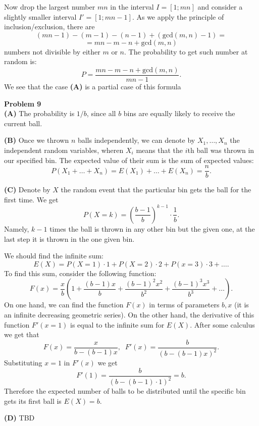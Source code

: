\documentclass[jou]{apa6}
\begin{document}
Now drop the largest number $mn$ in the interval $I=[1;mn]$ and consider a slightly smaller
interval $I'=[1;mn-1]$. As we apply the principle of inclusion/exclusion, there are 
$$(mn-1) - (m-1) - (n-1) + (\text{gcd}(m,n) - 1) = $$
$$ = mn - m-n+\text{gcd}(m,n)$$
numbers not divisible by either $m$ or $n$. The probability to get such number at random is:
\begin{equation}
\label{eq:gcd1}
P = \frac{mn - m-n+\text{gcd}(m,n)}{mn-1}.
\end{equation}
We see that the case {\bf (A)} is a partial case of this formula




\vspace{10pt}
{\bf Problem 9}\\
{\bf (A)} The probability is $1/b$, since all $b$ bins are equally 
likely to receive the current ball.

\vspace{4pt}
{\bf (B)} Once we thrown $n$ balls independently, 
we can denote by $X_1,\ldots,X_n$ the independent random 
variables, wheren $X_i$ means that the $i$th ball was thrown in 
our specified bin. The expected value of their sum is the sum of expected values:
$$P(X_1 + \ldots + X_n) = E(X_1) + \ldots + E(X_n) = \frac{n}{b}.$$

\vspace{4pt}
{\bf (C)} Denote by $X$ the random event that the particular bin gets the 
ball for the first time. We get
$$P(X=k) = \left(\frac{b-1}{b} \right)^{k-1} \cdot \frac{1}{b}.$$
Namely, $k-1$ times the ball is thrown in any other bin but the given one, 
at the last step it is thrown in the one given bin. 

We should find the infinite sum:
$$E(X) = P(X=1) \cdot 1 + P(X=2) \cdot 2 + P(x=3) \cdot 3 + \ldots.$$
To find this sum, consider the following function: 
$$F(x) = \frac{x}{b}\left( 1 + \frac{(b-1)x}{b} + \frac{(b-1)^2x^2}{b^2} + \frac{(b-1)^3x^3}{b^3} + \ldots \right).$$
On one hand, we can find the function $F(x)$ in terms of parameters $b,x$ (it is an 
infinite decreasing geometric series). On the other hand, the derivative of this 
function $F'(x=1)$ is equal to the infinite sum for $E(X)$. After some calculus 
we get that 
$$F(x) = \frac{x}{b - (b-1)x},\;\;F'(x) = \frac{b}{(b - (b-1)x)^2}.$$
Substituting $x=1$ in $F'(x)$ we get 
$$F'(1) = \frac{b}{(b - (b-1)\cdot 1)^2} = b.$$ 
Therefore the expected number of balls to be distributed until 
the specific bin gets its first ball is $E(X) = b$. 

{\bf (D)} TBD
\end{document}
